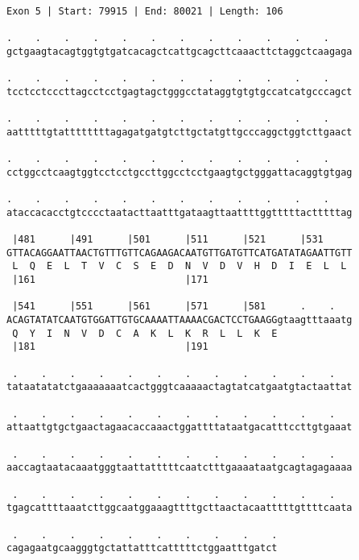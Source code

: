 \documentclass{article}
\begin{document}
\newpage
\begin{Verbatim}
Exon 5 | Start: 79915 | End: 80021 | Length: 106
 
.    .    .    .    .    .    .    .    .    .    .    .    
gctgaagtacagtggtgtgatcacagctcattgcagcttcaaacttctaggctcaagaga
  
.    .    .    .    .    .    .    .    .    .    .    .    
tcctcctcccttagcctcctgagtagctgggcctataggtgtgtgccatcatgcccagct
  
.    .    .    .    .    .    .    .    .    .    .    .    
aatttttgtattttttttagagatgatgtcttgctatgttgcccaggctggtcttgaact
  
.    .    .    .    .    .    .    .    .    .    .    .    
cctggcctcaagtggtcctcctgccttggcctcctgaagtgctgggattacaggtgtgag
  
.    .    .    .    .    .    .    .    .    .    .    .    
ataccacacctgtcccctaatacttaatttgataagttaattttggtttttactttttag
  
 |481      |491      |501      |511      |521      |531     
GTTACAGGAATTAACTGTTTGTTCAGAAGACAATGTTGATGTTCATGATATAGAATTGTT
 L  Q  E  L  T  V  C  S  E  D  N  V  D  V  H  D  I  E  L  L 
 |161                          |171                         
  
 |541      |551      |561      |571      |581      .    .   
ACAGTATATCAATGTGGATTGTGCAAAATTAAAACGACTCCTGAAGGgtaagtttaaatg
 Q  Y  I  N  V  D  C  A  K  L  K  R  L  L  K  E             
 |181                          |191                         
  
 .    .    .    .    .    .    .    .    .    .    .    .   
tataatatatctgaaaaaaatcactgggtcaaaaactagtatcatgaatgtactaattat
  
 .    .    .    .    .    .    .    .    .    .    .    .   
attaattgtgctgaactagaacaccaaactggattttataatgacatttccttgtgaaat
  
 .    .    .    .    .    .    .    .    .    .    .    .   
aaccagtaatacaaatgggtaattatttttcaatctttgaaaataatgcagtagagaaaa
  
 .    .    .    .    .    .    .    .    .    .    .    .   
tgagcattttaaatcttggcaatggaaagttttgcttaactacaatttttgttttcaata
  
 .    .    .    .    .    .    .    .    .    .
cagagaatgcaagggtgctattatttcatttttctggaatttgatct
\end{Verbatim}
\newpage
\end{document}
